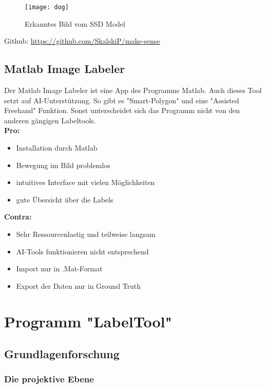 \documentclass[11pt]{scrartcl}
\begin{document}
\begin{figure}[H]
  \texttt{[image: dog]}
  \caption{Erkanntes Bild vom SSD Model}
\end{figure}

Github: \url{https://github.com/SkalskiP/make-sense} 
\subsection{Matlab Image Labeler}
\label{sec:Matlab Image Labeler}

Der Matlab Image Labeler ist eine App des Programms Matlab. Auch dieses Tool setzt auf AI-Unterstützung. So gibt es "Smart-Polygon" und eine "Assisted Freehand" Funktion. Sonst unterscheidet sich das Programm nicht von den anderen gängigen Labeltools.
\\

\textbf{Pro:} 
\begin{itemize}
	\item Installation durch Matlab
	\item Bewegung im Bild problemlos
	\item intuitives Interface mit vielen Möglichkeiten
	\item gute Übersicht über die Labels
\end{itemize}
\textbf{Contra:} 
\begin{itemize}
	\item Sehr Ressourcenlastig und teilweise langsam
	\item AI-Tools funktionieren nicht entsprechend
	\item Import nur in .Mat-Format
	\item Export der Daten nur in Ground Truth
\end{itemize}



\section{Programm "LabelTool"}
\label{sec:Programm "LabelTool"}
\subsection{Grundlagenforschung}
\label{sec:Grundlagenforschung}

\subsubsection{Die projektive Ebene}
\label{sec:Die projektive Ebene}
\end{document}
